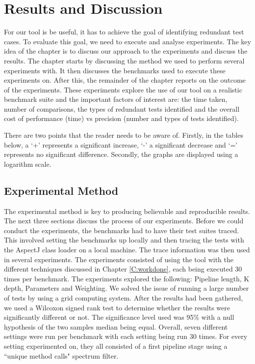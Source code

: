 \chapter{Results and Discussion}\label{C:results}\label{C:evaluation}

For our tool is be useful, it has to achieve the goal of identifying redundant test cases. To evaluate this goal, we need to execute and analyse experiments. The key idea of the chapter is to discuss our approach to the experiments and discuss the results. The chapter starts by discussing the method we used to perform several experiments with. It then discusses the benchmarks used to execute these experiments on. After this, the remainder of the chapter reports on the outcome of the experiments. These experiments explore the use of our tool on a realistic benchmark suite and the important factors of interest are: the time taken, number of comparisons, the types of redundant tests identified and the overall cost of performance (time) vs precision (number and types of tests identified).

There are two points that the reader needs to be aware of. Firstly, in the tables below, a `+' represents a significant increase, `-' a significant decrease and `=' represents no significant difference. Secondly, the graphs are displayed using a logarithm scale.

\section{Experimental Method}

The experimental method is key to producing believable and reproducible results. The next three sections discuss the process of our experiments. Before we could conduct the experiments, the benchmarks had to have their test suites traced. This involved setting the benchmarks up locally and then tracing the tests with the AspectJ class loader on a local machine. The trace information was then used in several experiments. The experiments consisted of using the tool with the different techniques discussed in Chapter \ref{C:workdone}, each being executed 30 times per benchmark. The experiments explored the following: Pipeline length, K depth, Parameters and Weighting. We solved the issue of running a large number of tests by using a grid computing system. After the results had been gathered, we used a Wilcoxon signed rank test \cite{wilcoxon1945individual} to determine whether the results were significantly different or not. The significance level used was 95\% with a null hypothesis of the two samples median being equal. Overall, seven different settings were run per benchmark with each setting being run 30 times. For every setting experimented on, they all consisted of a first pipeline stage using a ``unique method calls" spectrum filter. 

